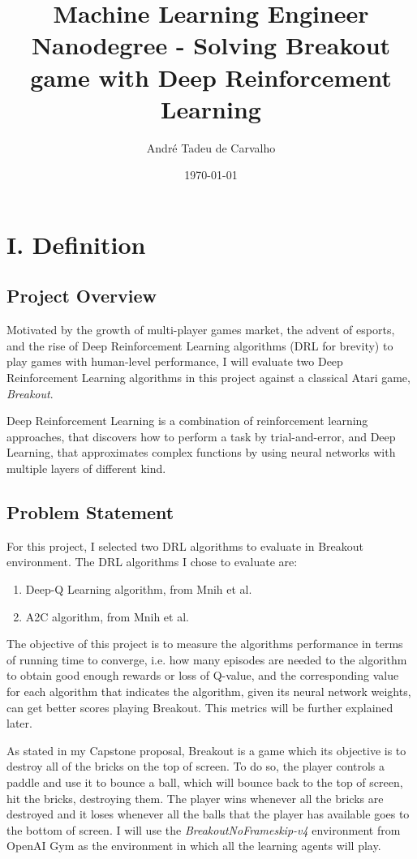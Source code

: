\documentclass[11pt,twoside,a4paper]{article}
\title{Machine Learning Engineer Nanodegree - Solving Breakout game with Deep Reinforcement Learning}
\author{Andr\'e Tadeu de Carvalho}
\date{\today}
\begin{document}
\maketitle

\section*{I. Definition}

\subsection*{Project Overview}

Motivated by the growth of multi-player games market, the advent of esports, and
the rise of Deep Reinforcement Learning algorithms (DRL for brevity) to play
games with human-level performance, I will evaluate two Deep Reinforcement
Learning algorithms in this project against a classical Atari\texttrademark
game, \emph{Breakout}.

Deep Reinforcement Learning is a combination of reinforcement learning
approaches, that discovers how to perform a task by trial-and-error, and Deep
Learning, that approximates complex functions by using neural networks with
multiple layers of different kind.

\subsection*{Problem Statement}

For this project, I selected two DRL algorithms to evaluate in Breakout
environment. The DRL algorithms I chose to evaluate are:
\begin{enumerate}
  \item Deep-Q Learning algorithm, from Mnih et al\cite{mnih2015humanlevel}.
  \item A2C algorithm, from Mnih et al\cite{DBLP:journals/corr/MnihBMGLHSK16}.
\end{enumerate}

The objective of this project is to measure the algorithms performance in terms
of running time to converge, i.e. how many episodes are needed to the algorithm
to obtain good enough rewards or loss of Q-value, and the corresponding value
for each algorithm that indicates the algorithm, given its neural network
weights, can get better scores playing Breakout. This metrics will be further
explained later.

As stated in my Capstone proposal\cite{capstone-proposal}, Breakout is a game
which its objective is to destroy all of the bricks on the top of screen. To do
so, the player controls a paddle and use it to bounce a ball, which will bounce
back to the top of screen, hit the bricks, destroying them. The player wins
whenever all the bricks are destroyed and it loses whenever all the balls that
the player has available goes to the bottom of screen. I will use the
\emph{BreakoutNoFrameskip-v4} environment from OpenAI Gym\cite{openai-gym}
\cite{DBLP:journals/corr/abs-1207-4708} as the environment in which all the
learning agents will play.
\end{document}

